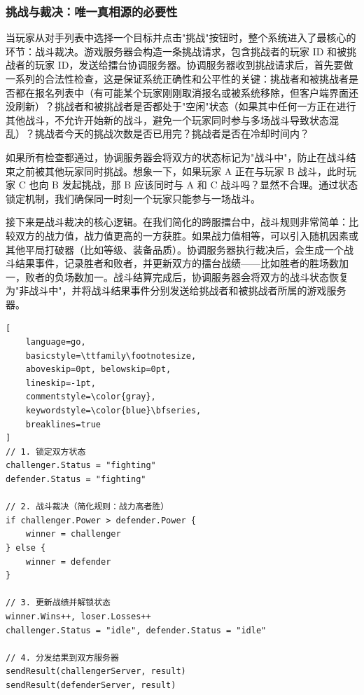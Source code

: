 \subsubsection{挑战与裁决：唯一真相源的必要性}

当玩家从对手列表中选择一个目标并点击"挑战"按钮时，整个系统进入了最核心的环节：战斗裁决。游戏服务器会构造一条挑战请求，包含挑战者的玩家 ID 和被挑战者的玩家 ID，发送给擂台协调服务器。协调服务器收到挑战请求后，首先要做一系列的合法性检查，这是保证系统正确性和公平性的关键：挑战者和被挑战者是否都在报名列表中（有可能某个玩家刚刚取消报名或被系统移除，但客户端界面还没刷新）？挑战者和被挑战者是否都处于"空闲"状态（如果其中任何一方正在进行其他战斗，不允许开始新的战斗，避免一个玩家同时参与多场战斗导致状态混乱）？挑战者今天的挑战次数是否已用完？挑战者是否在冷却时间内？

如果所有检查都通过，协调服务器会将双方的状态标记为"战斗中"，防止在战斗结束之前被其他玩家同时挑战。想象一下，如果玩家 A 正在与玩家 B 战斗，此时玩家 C 也向 B 发起挑战，那 B 应该同时与 A 和 C 战斗吗？显然不合理。通过状态锁定机制，我们确保同一时刻一个玩家只能参与一场战斗。

接下来是战斗裁决的核心逻辑。在我们简化的跨服擂台中，战斗规则非常简单：比较双方的战力值，战力值更高的一方获胜。如果战力值相等，可以引入随机因素或其他平局打破器（比如等级、装备品质）。协调服务器执行裁决后，会生成一个战斗结果事件，记录胜者和败者，并更新双方的擂台战绩——比如胜者的胜场数加一，败者的负场数加一。战斗结算完成后，协调服务器会将双方的战斗状态恢复为"非战斗中"，并将战斗结果事件分别发送给挑战者和被挑战者所属的游戏服务器。

\begin{tcolorbox}[title=战斗裁决的核心流程]
\begin{lstlisting}[
    language=go,
    basicstyle=\ttfamily\footnotesize,
    aboveskip=0pt, belowskip=0pt,
    lineskip=-1pt,
    commentstyle=\color{gray},
    keywordstyle=\color{blue}\bfseries,
    breaklines=true
]
// 1. 锁定双方状态
challenger.Status = "fighting"
defender.Status = "fighting"

// 2. 战斗裁决（简化规则：战力高者胜）
if challenger.Power > defender.Power {
    winner = challenger
} else {
    winner = defender
}

// 3. 更新战绩并解锁状态
winner.Wins++, loser.Losses++
challenger.Status = "idle", defender.Status = "idle"

// 4. 分发结果到双方服务器
sendResult(challengerServer, result)
sendResult(defenderServer, result)
\end{lstlisting}
\end{tcolorbox}

